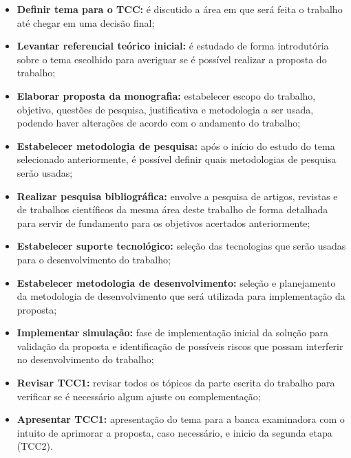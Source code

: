\begin{itemize}
    \item \textbf{Definir tema para o TCC:} é discutido a área em que será feita o trabalho até chegar em uma decisão final;

    \item \textbf{Levantar referencial teórico inicial:} é estudado de forma introdutória sobre o tema escolhido para averiguar se é possível realizar a proposta do trabalho;

    \item \textbf{Elaborar proposta da monografia:} estabelecer escopo do trabalho, objetivo, questões de pesquisa, justificativa e metodologia a ser usada, podendo haver alterações de acordo com o andamento do trabalho;

    \item \textbf{Estabelecer metodologia de pesquisa:} após o início do estudo do tema selecionado anteriormente, é possível definir quais metodologias de pesquisa serão usadas;

    \item \textbf{Realizar pesquisa bibliográfica:} envolve a pesquisa de artigos, revistas e de trabalhos científicos da mesma área deste trabalho de forma detalhada para servir de fundamento para os objetivos acertados anteriormente;

    \item \textbf{Estabelecer suporte tecnológico:} seleção das tecnologias que serão usadas para o desenvolvimento do trabalho;

    \item \textbf{Estabelecer metodologia de desenvolvimento:} seleção e planejamento da metodologia de desenvolvimento que será utilizada para implementação da proposta;

    \item \textbf{Implementar simulação:} fase de implementação inicial da solução para validação da proposta e identificação de possíveis riscos que possam interferir no desenvolvimento do trabalho;

    \item \textbf{Revisar TCC1:} revisar todos os tópicos da parte escrita do trabalho para verificar se é necessário algum ajuste ou complementação;

    \item \textbf{Apresentar TCC1:} apresentação do tema para a banca examinadora com o intuito de aprimorar a proposta, caso necessário, e inicio da segunda etapa (TCC2).

\end{itemize}

